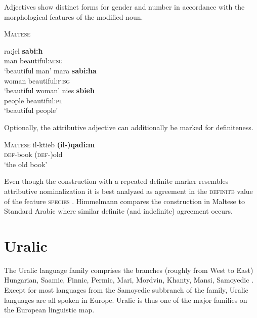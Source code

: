 Adjectives show distinct forms for gender and number in accordance with the morphological features of the modified noun.
\begin{exe}
\ex \textsc{Maltese} \citep[328]{aquilina1959}
\begin{xlist}
\ex
\gll	ra:jel \textbf{sabi:ħ}\\
	man beautiful:\textsc{m:sg}\\
\glt	‘beautiful man’
\ex
\gll	mara \textbf{sabi:ħa}\\
	woman beautiful:\textsc{f:sg}\\
\glt	‘beautiful woman’
\ex
\gll	nies \textbf{sbieħ}\\
	people beautiful:\textsc{pl}\\
\glt	‘beautiful people’
\end{xlist}
\end{exe}
Optionally, the attributive adjective can additionally be marked for definiteness. \begin{exe}
\ex \textsc{Maltese} \citep[330]{aquilina1959} 
\gll	il-ktieb \textbf{(il-)qadi:m}\\
	\textsc{def}-book	(\textsc{def-})old\\
\glt	‘the old book’
\end{exe}
Even though the construction with a repeated definite marker resembles attributive nominalization it is best analyzed as agreement in the \textsc{definite} value of the feature \textsc{species} \citep[179]{himmelmann1997}. Himmelmann compares the construction in Maltese to Standard Arabic where similar definite (and indefinite) agreement occurs.
				
\section{Uralic}\label{uralic synchr}
The Uralic language family comprises the branches (roughly from West to East) Hungarian, Saamic, Finnic, Permic, Mari, Mordvin, Khanty, Mansi, Samoyedic \cite[216–218]{salminen2007}. Except for most languages from the Samoyedic subbranch of the family, Uralic languages are all spoken in Europe. Uralic is thus one of the major families on the European linguistic map.


